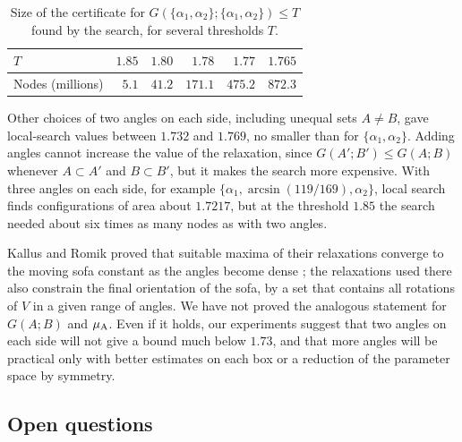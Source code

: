 \begin{table}[ht]
\centering
\caption{Size of the certificate for $G(\{\alpha_1,\alpha_2\};\{\alpha_1,\alpha_2\})\le T$ found by the search, for several thresholds $T$.}
\label{tab:growth}
\begin{tabular}{@{}lrrrrr@{}}
\toprule
$T$ & $1.85$ & $1.80$ & $1.78$ & $1.77$ & $1.765$ \\
\midrule
Nodes (millions) & $5.1$ & $41.2$ & $171.1$ & $475.2$ & $872.3$ \\
\bottomrule
\end{tabular}
\end{table}

Other choices of two angles on each side, including unequal sets $A\neq B$, gave local-search values between $1.732$ and $1.769$, no smaller than for $\{\alpha_1,\alpha_2\}$. Adding angles cannot increase the value of the relaxation, since $G(A';B')\le G(A;B)$ whenever $A\subset A'$ and $B\subset B'$, but it makes the search more expensive. With three angles on each side, for example $\{\alpha_1,\arcsin(119/169),\alpha_2\}$, local search finds configurations of area about $1.7217$, but at the threshold $1.85$ the search needed about six times as many nodes as with two angles.

Kallus and Romik proved that suitable maxima of their relaxations converge to the moving sofa constant as the angles become dense \cite[Theorem~5]{kallusromik2018}; the relaxations used there also constrain the final orientation of the sofa, by a set that contains all rotations of $V$ in a given range of angles. We have not proved the analogous statement for $G(A;B)$ and $\mu_{\mathrm{A}}$. Even if it holds, our experiments suggest that two angles on each side will not give a bound much below $1.73$, and that more angles will be practical only with better estimates on each box or a reduction of the parameter space by symmetry.

\subsection{Open questions}

